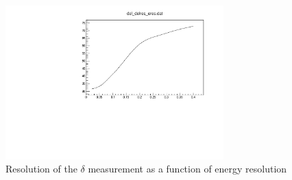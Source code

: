 \documentclass[prd,showpacs,groupedaddress,superscriptaddress,amsmath,amssymb]{revtex4-2} %
\begin{document}
\begin{figure}[h]
\begin{center}
\includegraphics[width=0.75\textwidth]{del_delres_eres.pdf}
\caption {Resolution of the $\delta$ measurement as a function of energy resolution
\label{fig:del_delres_eres}}
\end{center}
\end{figure}




\clearpage


\end{document}
